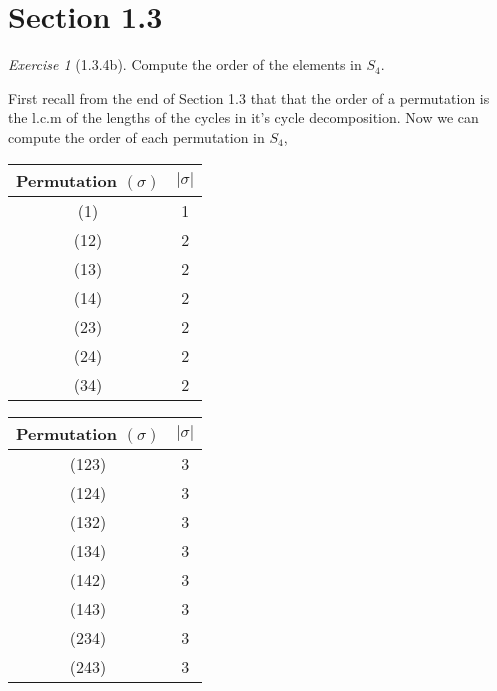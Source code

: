 \documentclass[12pt]{amsart}
\makeatletter
\theoremstyle{remark}
\newtheorem*{exercise}{Exercise}%
\renewenvironment{proof}[1][\proofname]{\par\doublespacing
  \pushQED{\qed}%
  \normalfont \topsep6\p@\@plus6\p@\relax
  \list{}{%
    \settowidth{\leftmargin}{\itshape\proofname:\hskip\labelsep}%
    \setlength{\labelwidth}{0pt}%
    \setlength{\itemindent}{-\leftmargin}%
  }%
  \item[\hskip\labelsep\itshape#1\@addpunct{:}]\ignorespaces
}{%
  \popQED\endlist\@endpefalse
  \singlespacing
}
\theoremstyle{mycomment}
\makeatother
\begin{document}
\section*{\textbf{Section 1.3}}

\begin{exercise}[1.3.4b] Compute the order of the elements in $S_4$.
  \begin{proof}[Solution:] First recall from the end of Section 1.3 
    that that the order of a permutation is the l.c.m of the lengths of the cycles in it's cycle decomposition. Now we can compute the order of each permutation in $S_4$,
    \begin{center}
    \begin{minipage}{.45\textwidth}
      \begin{tabular}{c | c } 
        Permutation $(\sigma)$ & $|\sigma|$ \\ 
        \hline
        (1) & 1\\
        (12) & 2\\
        (13) & 2\\
        (14) & 2\\
        (23) & 2\\
        (24) & 2\\
        (34) & 2
      \end{tabular}
    \end{minipage}
    \hfill
    \begin{minipage}{.45\textwidth}
      \begin{tabular}{c | c } 
        Permutation $(\sigma)$ & $|\sigma|$ \\ 
        \hline
        (123) & 3\\
        (124) & 3\\
        (132) & 3\\
        (134) & 3\\
        (142) & 3\\
        (143) & 3\\
        (234) & 3\\
        (243) & 3
      \end{tabular}
    \end{minipage}     
  \end{center}


\end{proof}
\end{exercise}
\end{document}
